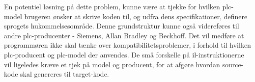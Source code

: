 En potentiel løsning på dette problem, kunne være at tjekke for hvilken \gls{plc}-model brugeren ønsker at skrive koden til, og udfra dens specifikationer, definere sprogets hukommelsesområde. Denne grundstruktur kunne også videreføres til andre \gls{plc}-producenter - Siemens, Allan Bradley og Beckhoff. Det vil medføre at programmøren ikke skal tænke over kompatibilitetsproblemer, i forhold til hvilken \gls{plc}-producent og \gls{plc}-model der anvendes. 
De små forskelle på \gls{il}-instruktionerne vil ligeledes kræve et tjek på model og producent, for at afgøre hvordan source-kode skal genereres til target-kode.







